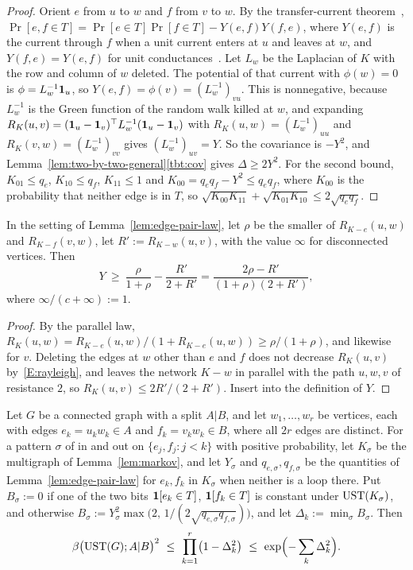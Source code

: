 \begin{proof}
Orient $e$ from $u$ to $w$ and $f$ from $v$ to $w$. By the transfer-current theorem~\cite{BurtonPemantle93}, $\Pr[e,f\in T]=\Pr[e\in T]\Pr[f\in T]-Y(e,f)Y(f,e)$, where $Y(e,f)$ is the current through $f$ when a unit current enters at $u$ and leaves at $w$, and $Y(f,e)=Y(e,f)$ for unit conductances~\cite[Ch.~4]{LyonsPeres16}. Let $L_w$ be the Laplacian of $K$ with the row and column of $w$ deleted. The potential of that current with $\phi(w)=0$ is $\phi=L_w^{-1}\mathbf{1}_u$, so $Y(e,f)=\phi(v)=(L_w^{-1})_{vu}$. This is nonnegative, because $L_w^{-1}$ is the Green function of the random walk killed at $w$, and expanding $R_K(u,v)=(\mathbf{1}_u-\mathbf{1}_v)^\top L_w^{-1}(\mathbf{1}_u-\mathbf{1}_v)$ with $R_K(u,w)=(L_w^{-1})_{uu}$ and $R_K(v,w)=(L_w^{-1})_{vv}$ gives $(L_w^{-1})_{uv}=Y$. So the covariance is $-Y^2$, and Lemma~\ref{lem:two-by-two-general}\ref{tbt:cov} gives $\Delta\ge2Y^2$. For the second bound, $K_{01}\le q_e$, $K_{10}\le q_f$, $K_{11}\le1$ and $K_{00}=q_eq_f-Y^2\le q_eq_f$, where $K_{00}$ is the probability that neither edge is in $T$, so $\sqrt{K_{00}K_{11}}+\sqrt{K_{01}K_{10}}\le2\sqrt{q_eq_f}$.
\end{proof}

\begin{lemma}\label{lem:edge-pair-res}
In the setting of Lemma~\ref{lem:edge-pair-law}, let $\rho$ be the smaller of $R_{K-e}(u,w)$ and $R_{K-f}(v,w)$, let $R':=R_{K-w}(u,v)$, with the value $\infty$ for disconnected vertices. Then
\[
  Y\ \ge\ \frac\rho{1+\rho}-\frac{R'}{2+R'}=\frac{2\rho-R'}{(1+\rho)(2+R')},
\]
where $\infty/(c+\infty):=1$.
\end{lemma}

\begin{proof}
By the parallel law, $R_K(u,w)=R_{K-e}(u,w)/(1+R_{K-e}(u,w))\ge\rho/(1+\rho)$, and likewise for $v$. Deleting the edges at $w$ other than $e$ and $f$ does not decrease $R_K(u,v)$ by~\ref{E:rayleigh}, and leaves the network $K-w$ in parallel with the path $u,w,v$ of resistance $2$, so $R_K(u,v)\le2R'/(2+R')$. Insert into the definition of $Y$.
\end{proof}

\begin{theorem}\label{thm:edge-pair}
Let $G$ be a connected graph with a split $A|B$, and let $w_1,\dots,w_r$ be vertices, each with edges $e_k=u_kw_k\in A$ and $f_k=v_kw_k\in B$, where all $2r$ edges are distinct. For a pattern $\sigma$ of in and out on $\{e_j,f_j:j<k\}$ with positive probability, let $K_\sigma$ be the multigraph of Lemma~\ref{lem:markov}, and let $Y_\sigma$ and $q_{e,\sigma},q_{f,\sigma}$ be the quantities of Lemma~\ref{lem:edge-pair-law} for $e_k,f_k$ in $K_\sigma$ when neither is a loop there. Put $B_\sigma:=0$ if one of the two bits $\mathbf{1}[e_k\in T]$, $\mathbf{1}[f_k\in T]$ is constant under $\mathrm{UST}(K_\sigma)$, and otherwise $B_\sigma:=Y_\sigma^2\max\bigl(2,\,1/(2\sqrt{q_{e,\sigma}q_{f,\sigma}})\bigr)$, and let $\Delta_k:=\min_\sigma B_\sigma$. Then
\[
  \beta\bigl(\UST(G);A|B\bigr)^2\ \le\ \prod_{k=1}^r\bigl(1-\Delta_k^2\bigr)\ \le\ \exp\Bigl(-\sum_k\Delta_k^2\Bigr).
\]
\end{theorem}

